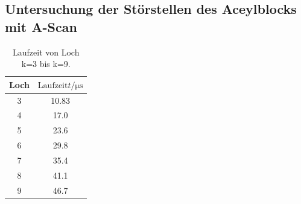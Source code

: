 \subsection{Untersuchung der Störstellen des Aceylblocks mit A-Scan}
\label{Untersuchung der Störstellen des Aceylblocks mit A-Scan}

\begin{table}[H]
    \centering
    \caption{Laufzeit von Loch k=3 bis k=9.}
    \label{tab:Laufzeit}
\begin{tabular}{c c}
    \toprule
    Loch & $\text{Laufzeit} t / \si{\micro\second} $\\
    \midrule
     3 & 10.83 \\
     4 &  17.0 \\
     5 &  23.6 \\
     6 &  29.8 \\
     7 &  35.4 \\
     8 &  41.1 \\
     9 &  46.7 \\
    \bottomrule
\end{tabular}
\end{table}